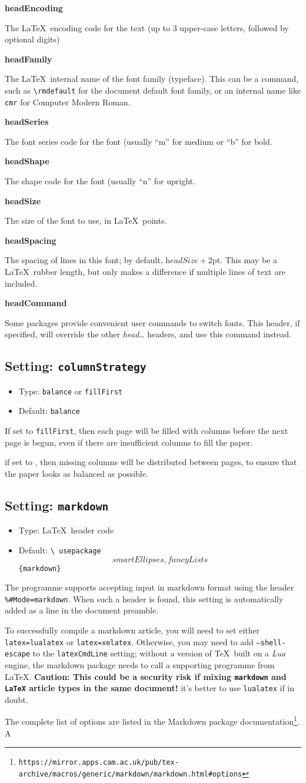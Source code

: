 \documentclass[a4paper,DIV=11]{scrartcl}
\newcommand{\deft}[2]{\nopagebreak\noindent\hspace{0.5in}\textbf{#1}\par\noindent{}#2\pagebreak[1]\par}
\newcommand{\property}[5]{
  \subsection{#1: \texttt{#2}}
  \begin{itemize}
  \item Type: #3
  \item Default: #4
  \end{itemize}
  #5
}
\newcommand{\setting}{\property{Setting}}
\begin{document}
\begin{multicols}{2}
{  \deft{headEncoding}{The \LaTeX\ encoding code for the text (up to 3 upper-case
    letters, followed by optional digits)}
  \deft{headFamily}{The \LaTeX\ internal name of the font family (typeface). This
    can be a command, such as \texttt{\textbackslash rmdefault} for
    the document default font family, or an internal name like
    \texttt{cmr} for Computer Modern Roman.}
  \deft{headSeries}{The font series code for the font (usually ``m''
    for medium or ``b'' for bold.}
  \deft{headShape}{The shape code for the font (usually ``n'' for
    upright.}
  \deft{headSize}{The size of the font to use, in \LaTeX\ points.}
  \deft{headSpacing}{The spacing of lines in this font; by default,
    $\textit{headSize} + 2\textrm{pt}$. This may be a \LaTeX\ rubber
    length, but only makes a difference if multiple lines of text are
    included.}
  \deft{headCommand}{Some packages provide convenient user commands to
    switch fonts. This header, if specified, will override the other
    \textit{head\dots} headers, and use this command instead.
  }
}
\setting{columnStrategy}{\texttt{balance} or \texttt{fillFirst}}{\texttt{balance}}{
  If set to \texttt{fillFirst}, then each page will be filled with columns before the next
  page is begun, even if there are insufficient columns to fill the paper.\par
  if set to \textt{balance}, then missing columns will be distributed between pages, to ensure
  that the paper looks as balanced as possible.
}
\setting{markdown}{\LaTeX\ header code}{\texttt{\textbackslash
    usepackage\[smartEllipses,fancyLists\]\{markdown\}}}{
    The programme supports accepting input in markdown format using the
    header \texttt{\%\#Mode=markdown}. When such a header is found,
    this setting is automatically added as a line in the document
    preamble.\par
    To successfully compile a markdown article, you will need to set either
    \texttt{latex=lualatex} or \texttt{latex=xelatex}.
    Otherwise, you may need to add
    \texttt{--shell-escape} to the \texttt{latexCmdLine} setting;
    without a version of \TeX\ built on a \textit{Lua} engine, the
    markdown package needs to call a
    supporting programme from \LaTeX. \textbf{Caution: This could be a
      security risk if mixing \texttt{markdown} and \texttt{LaTeX}
      article types in the same document!} it's better to use
    \texttt{lualatex} if in doubt.\par
    The complete list of options are listed in the Markdown package
    documentation\footnote{\texttt{https://mirror.apps.cam.ac.uk/pub/tex-archive/macros/generic/markdown/markdown.html\#options}}. A
}
\end{multicols}
\end{document}
